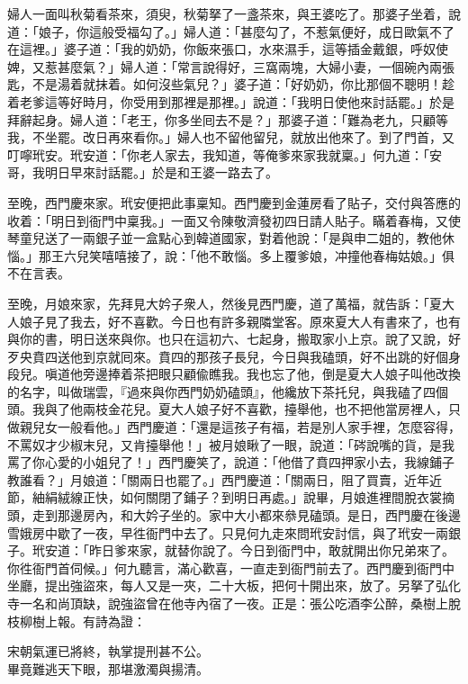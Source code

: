 婦人一面叫秋菊看茶來，須臾，秋菊拏了一盞茶來，與王婆吃了。那婆子坐着，說道：「娘子，你這般受福勾了。」{}婦人道：「甚麼勾了，不惹氣便好，成日歐氣不了在這裡。」婆子道：「我的奶奶，你飯來張口，水來濕手，這等插金戴銀，呼奴使婢，又惹甚麼氣？」婦人道：「常言說得好，三窩兩塊，大婦小妻，一個碗內兩張匙，不是湯着就抹着。如何沒些氣兒？」婆子道：「好奶奶，你比那個不聰明！趁着老爹這等好時月，你受用到那裡是那裡。」說道：「我明日使他來討話罷。」於是拜辭起身。婦人道：「老王，你多坐囘去不是？」那婆子道：「難為老九，只顧等我，不坐罷。改日再來看你。」婦人也不留他留兒，就放出他來了。到了門首，又叮嚀玳安。玳安道：「你老人家去，我知道，等俺爹來家我就稟。」何九道：「安哥，我明日早來討話罷。」於是和王婆一路去了。

至晚，西門慶來家。玳安便把此事稟知。西門慶到金蓮房看了貼子，交付與答應的收着：「明日到衙門中稟我。」一面又令陳敬濟發初四日請人貼子。瞞着春梅，又使琴童兒送了一兩銀子並一盒點心到韓道國家，對着他說：「是與申二姐的，教他休惱。」那王六兒笑嘻嘻接了，說：「他不敢惱。多上覆爹娘，冲撞他春梅姑娘。」俱不在言表。

至晚，月娘來家，先拜見大妗子衆人，然後見西門慶，道了萬福，就告訴：「夏大人娘子見了我去，好不喜歡。今日也有許多親隣堂客。原來夏大人有書來了，也有與你的書，明日送來與你。{}也只在這初六、七起身，搬取家小上京。說了又說，好歹央賁四送他到京就囘來。賁四的那孩子長兒，今日與我磕頭，好不出跳的好個身段兒。嗔道他旁邊捧着茶把眼只顧偸瞧我。我也忘了他，倒是夏大人娘子叫他改換的名字，叫做瑞雲，『過來與你西門奶奶磕頭』，他纔放下茶托兒，與我磕了四個頭。我與了他兩枝金花兒。夏大人娘子好不喜歡，擡舉他，也不把他當房裡人，只做親兒女一般看他。」西門慶道：「還是這孩子有福，若是別人家手裡，怎麼容得，不罵奴才少椒末兒，又肯擡舉他！」{}被月娘瞅了一眼，說道：「硶說嘴的貨，是我罵了你心愛的小姐兒了！」西門慶笑了，說道：「他借了賁四押家小去，我線鋪子教誰看？」月娘道：「關兩日也罷了。」西門慶道：「關兩日，阻了買賣，近年近節，紬絹絨線正快，如何關閉了鋪子？到明日再處。」說畢，月娘進裡間脫衣裳摘頭，走到那邊房內，和大妗子坐的。家中大小都來叅見磕頭。是日，西門慶在後邊雪娥房中歇了一夜，早徃衙門中去了。只見何九走來問玳安討信，與了玳安一兩銀子。玳安道：「昨日爹來家，就替你說了。今日到衙門中，敢就開出你兄弟來了。你徃衙門首伺候。」何九聽言，滿心歡喜，一直走到衙門前去了。西門慶到衙門中坐廳，提出強盜來，每人又是一夾，二十大板，把何十開出來，放了。另拏了弘化寺一名和尚頂缺，說強盜曾在他寺內宿了一夜。{}正是：張公吃酒李公醉，桑樹上脫枝柳樹上報。有詩為證：

\begin{myquote} 
宋朝氣運已將終，執掌提刑甚不公。\\畢竟難逃天下眼，那堪激濁與揚清。
\end{myquote} 

